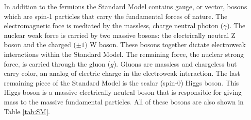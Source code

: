 In addition to the fermions the Standard Model contains gauge, or vector, bosons which are spin-1 particles that carry the fundamental forces of nature.  The electromagnetic foce is mediated by the massless, charge neutral photon ($\gamma$). The nuclear weak force is carried by two massive bosons: the electrically neutral Z boson and the charged ($\pm 1$) W boson.  These bosons together dictate electroweak interactions within the Standard Model.  The remaining force, the nuclear strong force, is carried through the gluon ($g$).  Gluons are massless and chargeless but carry color, an analog of electric charge in the electroweak interaction.  The last remaining piece of the Standard Model is the scalar (spin-0) Higgs boson.  This Higgs boson is a massive electrically neutral boson that is responsible for giving mass to the massive fundamental particles.  All of these bosons are also shown in Table \ref{tab:SM}.  

